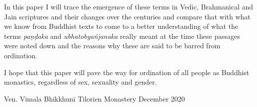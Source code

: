In this paper I will trace the emergence of these terms in Vedic, Brahmanical and Jain scriptures and their changes over the centuries and compare that with what we know from Buddhist texts to come to a better understanding of what the terms {\em paṇḍaka} and {\em ubhatob­yañ­janaka} really meant at the time these passages were noted down and the reasons why these are said to be barred from ordination.

I hope that this paper will pave the way for ordination of all people as Buddhist monastics, regardless of sex, sexuality and gender.

Ven. Vimala Bhikkhunī
Tilorien Monastery
December 2020